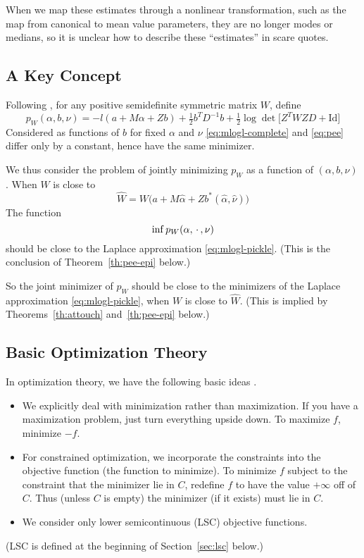 When we map these estimates through a nonlinear transformation, such as the
map from canonical to mean value parameters,
they are no longer modes or medians, so it is unclear how to describe these
``estimates'' in scare quotes.

\subsection{A Key Concept}

Following \citet{reaster},
for any positive semidefinite symmetric matrix $W$, define
\begin{equation} \label{eq:pee}
   p_W(\alpha, b, \nu) =
   - l(a + M \alpha + Z b) + \tfrac{1}{2} b^T D^{-1} b
   + \tfrac{1}{2} \log \det \bigl[ Z^T W Z D + \text{Id}
   \bigr]
\end{equation}
Considered as functions of $b$ for fixed $\alpha$ and $\nu$
\eqref{eq:mlogl-complete} and \eqref{eq:pee} differ only by a constant,
hence have the same minimizer.

We thus consider the problem of jointly
minimizing $p_W$ as a function of $(\alpha, b, \nu)$.
When $W$ is close to
\begin{equation} \label{eq:w-hat}
   \widehat{W} =
   W\bigl(a + M \hat{\alpha} + Z b^*(\hat{\alpha}, \hat{\nu})\bigr)
\end{equation}
The function
$$
   \inf p_W(\alpha, \,\cdot\,, \nu)
$$
should be close to the Laplace approximation \eqref{eq:mlogl-pickle}.
(This is the conclusion of Theorem~\ref{th:pee-epi} below.)

So the joint minimizer of $p_W$ should be close to the minimizers
of the Laplace approximation \eqref{eq:mlogl-pickle},
when $W$ is close to $\hat{W}$.
(This is implied by Theorems~\ref{th:attouch} and~\ref{th:pee-epi} below.)

\subsection{Basic Optimization Theory}
\label{sec:basic}

In optimization theory, we have the following basic ideas
\citep[Sections~1.A, 1.B, and~1.C]{rockafellar-wets}.
\begin{itemize}
\item We explicitly deal with minimization rather than maximization.  If
    you have a maximization problem, just turn everything upside down.
    To maximize $f$, minimize $- f$.
\item For constrained optimization, we incorporate the constraints into
    the objective function (the function to minimize).
    To minimize $f$ subject to the constraint
    that the minimizer lie in $C$, redefine $f$ to have the value $+\infty$
    off of $C$.  Thus (unless $C$ is empty) the minimizer (if it exists)
    must lie in $C$.
\item We consider only lower semicontinuous (LSC) objective functions.
\end{itemize}
(LSC is defined at the beginning of Section~\ref{sec:lsc} below.)

